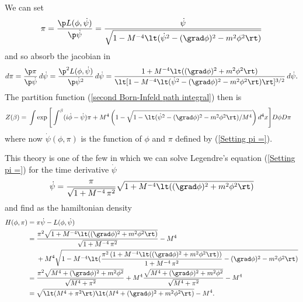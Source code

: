 \documentclass[prd,preprint,floatfix,showpacs]{revtex4-1}
\begin{document}
\par
We can set
\begin{equation}
\pi ={} \frac{ \p  L(\phi, \dot \psi)  }{ \p \dot \psi } = 
\frac{\dot \psi}
{\sqrt{ 1-  M^{-4} \lt(\dot \psi^2 
- (\grad \phi)^2 - m^2 \phi^2 \rt) }}
\label {Setting pi =}
\end{equation}
and so absorb the jacobian in
\begin{equation}
d\pi ={} \frac{\p \pi}{\p \dot \psi} \, d \dot \psi
= \frac{ \p^2  L(\phi, \dot \psi) }{ \p \dot \psi^2  } \, d \dot \psi
={} \frac{1 + M^{-4}\lt((\grad \phi)^2 + m^2 \phi^2\rt)}
{\lt[ 1-  M^{-4} \lt(\dot \psi^2 
- (\grad \phi)^2 - m^2 \phi^2 \rt) \rt]^{3/2} } 
\, d \dot \psi  .
\label {we have}
\end{equation}
The partition function 
(\ref {second Born-Infeld path integral}) 
then is
\begin{equation}
   \begin{split}
Z(\beta)  
= {}& \int \exp \Bigg[ \int^\beta 
( i \dot \phi - \dot \psi ) \pi
 + M^4 \left( 1 - 
\sqrt{ 1-  
\lt(\dot \psi^2 
- (\grad \phi)^2 - m^2 \phi^2 \rt)/M^4 } \right)
d^4x \Bigg]  D\phi D \pi 
\label {third Born-Infeld path integral}
   \end{split}
\end{equation}
where now \( \dot \psi(\phi,\pi) \) 
is the function of \( \phi \) and \( \pi \)
defined by (\ref {Setting pi =})\@.
\par
This theory is one of the few 
in which we can solve Legendre's equation
(\ref {Setting pi =})
for the time derivative \( \dot \psi \)
\begin{equation}
\dot \psi = \frac{\pi}{\sqrt{1 + M^{-4} \, \pi^2}}
\sqrt{1 + M^{-4} 
\lt( (\grad \phi)^2 + m^2 \phi^2 \rt)}  
\label {dot psi}
\end{equation}
and find as the hamiltonian density
\begin{equation}
   \begin{split}
H(\phi,\pi) = {}& \pi \dot \psi - L(\phi, \dot \psi) 
\\
={}& \frac{\pi^2\sqrt{1 + M^{-4} 
\lt( (\grad \phi)^2 + m^2 \phi^2 \rt)}}
{\sqrt{1 + M^{-4} \, \pi^2}} - M^4
\\
{}& + M^4
\sqrt{ 1-  M^{-4}
\lt( \frac{\pi^2 \left(1 + M^{-4} 
\lt( (\grad \phi)^2 + m^2 \phi^2 \rt)\right)}{1 + M^{-4} \, \pi^2}
- (\grad \phi)^2 - m^2 \phi^2 \rt) } 
\\
={}&  \frac{\pi^2\sqrt{M^4 +  (\grad \phi)^2 + m^2 \phi^2 }}
{\sqrt{M^4 + \pi^2}}
+ M^4 \frac{\sqrt{M^4 + (\grad \phi)^2 + m^2 \phi^2}}
{\sqrt{M^4 + \pi^2}} - M^4
\\
= {}& \sqrt{\lt(M^4 + \pi^2\rt)
\lt(M^4 + (\grad \phi)^2 + m^2 \phi^2\rt)}  - M^4 .
\label {H1}
   \end{split}
\end{equation}
\end{document}
